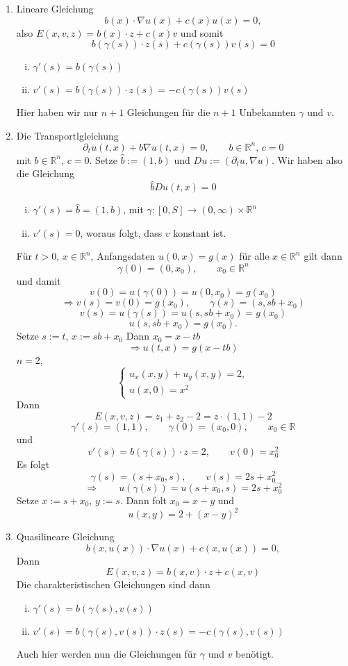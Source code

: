 \begin{beispiel}
	\begin{enumerate}[1.]
		\item Lineare Gleichung \[
			b(x) \cdot  \nabla u(x) + c(x) u(x) = 0,
		\]also $E(x,v,z) = b(x) \cdot z + c(x) v$ und somit
		\[
			b(\gamma(s)) \cdot z(s) + c (\gamma(s))v(s) = 0
		\]
		\begin{enumerate}[(i)]
			\item $\gamma'(s) = b(\gamma(s))$
			\item $v'(s) = b(\gamma(s)) \cdot z(s) = -c (\gamma(s))v(s)$
		\end{enumerate}
		Hier haben wir nur $n+1$ Gleichungen für die $n+1$ Unbekannten $\gamma$ und $v$.
		\item Die Transportlgleichung
		\[
			\partial_t u(t,x) + b  \nabla u(t,x) = 0, \qquad b \in \mathbb{R}^n,\, c=0
		\]
		mit $b \in \mathbb{R}^n$, $c=0$. Setze $\hat{b}:= (1,b)$ und $Du:= ( \partial_t u,  \nabla u)$. Wir haben also die Gleichung
		\[
			\hat{b} Du(t,x) = 0
		\]
		\begin{enumerate}[(i)]
			\item $\gamma'(s) = \hat{b} = (1,b)$, mit $\gamma : [0,S] \to (0,\infty) \times \mathbb{R}^n$
			\item $v'(s) = 0$, woraus folgt, dass $v$ konstant ist.
		\end{enumerate}
		Für $t>0$, $x \in \mathbb{R}^n$, Anfangsdaten $u(0,x) = g(x)$ für alle $x \in \mathbb{R}^n$ gilt dann
		\[
			\gamma(0) = (0,x_0), \qquad x_0 \in \mathbb{R}^n
		\]
		und damit
		\[
			v(0) = u(\gamma(0))= u(0,x_0) = g(x_0)
		\]
		\[
			\Rightarrow v(s) = v(0) = g(x_0), \qquad \gamma(s) = (s, sb + x_0)
		\]
		\[
			v(s) = u(\gamma(s)) = u(s, sb+x_0) = g(x_0)
		\]
		\[
			u(s,sb+ x_0) = g(x_0).
		\]
		Setze $s:=t$, $x:= sb+x_0$ Dann $x_0 = x - tb$
		\[
			\Rightarrow u(t,x)= g(x-tb)
		\]
		$n=2$,
		\[
			\begin{cases}
				u_x(x,y)+ u_y(x,y) =2,\\
				u(x,0)= x^2
			\end{cases}
		\]
		Dann
		\[
			E(x,v,z) = z_1+z_2 -2 = z \cdot (1,1) - 2
		\]
		\[
			\gamma'(s) = (1,1), \qquad \gamma(0) = (x_0,0), \qquad x_0 \in \mathbb{R}
		\]
		und 
		\[
			v'(s) = b(\gamma(s)) \cdot z = 2, \qquad v(0) = x_0^2
		\]
		Es folgt
		\[
			\gamma(s) = (s+x_0,s), \qquad v(s) = 2s + x_0^2
		\]
		\[
			\Rightarrow \qquad u(\gamma(s)) = u(s+x_0,s) = 2s+ x_0^2
		\]
		Setze $x:= s+ x_0$, $y:=s$. Dann folt $x_0= x-y$ und
		\[
			u(x,y) = 2+ (x-y)^2
		\]
		\item Quasilineare Gleichung 
		\[
			b(x,u(x)) \cdot  \nabla u(x) + c(x,u(x)) = 0,
		\]
		Dann \[
			E(x,v,z) = b(x,v) \cdot z + c(x,v)
		\]
		Die charakteristischen Gleichungen sind dann
		\begin{enumerate}[(i)]
			\item $\gamma'(s) = b(\gamma(s),v(s))$
			\item $v'(s) = b(\gamma(s),v(s)) \cdot z(s) = -c (\gamma(s),v(s))$
		\end{enumerate}
		Auch hier werden nun die Gleichungen für $\gamma$ und $v$ benötigt.
	\end{enumerate}
\end{beispiel}

